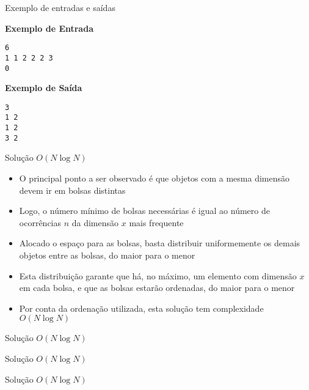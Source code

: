 \begin{frame}[fragile]{Exemplo de entradas e saídas}

\begin{minipage}[t]{0.5\textwidth}
\textbf{Exemplo de Entrada}
\begin{verbatim}
6
1 1 2 2 2 3
0
\end{verbatim}
\end{minipage}
\begin{minipage}[t]{0.45\textwidth}
\textbf{Exemplo de Saída}
\begin{verbatim}
3
1 2
1 2
3 2
\end{verbatim}
\end{minipage}
\end{frame}

\begin{frame}[fragile]{Solução $O(N\log N)$}

    \begin{itemize}
        \item O principal ponto a ser observado é que objetos com a mesma dimensão devem ir
            em bolsas distintas

        \item Logo, o número mínimo de bolsas necessárias é igual ao número de ocorrências $n$ da
            dimensão $x$ mais frequente

        \item Alocado o espaço para as bolsas, basta distribuir uniformemente os demais objetos 
            entre as bolsas, do maior para o menor

        \item Esta distribuição garante que há, no máximo, um elemento com dimensão $x$ em cada
            bolsa, e que as bolsas estarão ordenadas, do maior para o menor

        \item Por conta da ordenação utilizada, esta solução tem complexidade $O(N\log N)$
   \end{itemize}

\end{frame}

\begin{frame}[fragile]{Solução $O(N\log N)$}
\end{frame}

\begin{frame}[fragile]{Solução $O(N\log N)$}
\end{frame}

\begin{frame}[fragile]{Solução $O(N\log N)$}
\end{frame}
